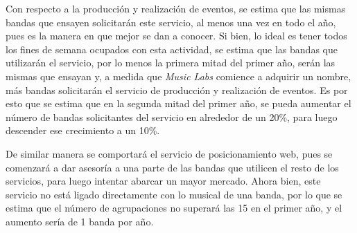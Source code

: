 Con respecto a la producción y realización de eventos, se estima que las mismas bandas
que ensayen solicitarán este servicio, al menos una vez en todo el año, pues es la manera
en que mejor se dan a conocer. Si bien, lo ideal es tener todos los fines de semana ocupados 
con esta actividad, se estima que las bandas que utilizarán el servicio, por lo menos la primera 
mitad del primer año, serán las mismas que ensayan y, a medida que \emph{Music Labs} comience
a adquirir un nombre, más bandas solicitarán el servicio de producción y realización de eventos.
Es por esto que se estima que en la segunda mitad del primer año, se pueda aumentar el número
de bandas solicitantes del servicio en alrededor de un 20\%, para luego descender ese crecimiento a 
un 10\%. 

De similar manera se comportará el servicio de posicionamiento web, pues se comenzará a dar
asesoría a una parte de las bandas que utilicen el resto de los servicios, para luego intentar
abarcar un mayor mercado. Ahora bien, este servicio no está ligado directamente con lo musical 
de una banda, por lo que se estima que el número de agrupaciones no superará las 15 en el primer 
año, y el aumento sería de 1 banda por año.

